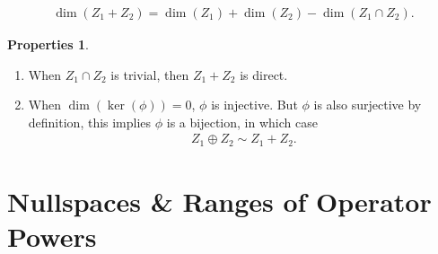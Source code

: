 \documentclass{book}
\theoremstyle{definition}
\newtheorem{prop}{Properties}[section]
\begin{document}
\begin{align*}
\dim(Z_1 + Z_2) = \dim(Z_1) + \dim(Z_2) - \dim(Z_1\cap Z_2).
\end{align*}
\begin{prop}
	$\,$
	\begin{enumerate}
		\item When $Z_1\cap Z_2$ is trivial, then $Z_1 + Z_2$ is direct. 
		\item When $\dim(\ker(\phi)) = 0$, $\phi$ is injective. But $\phi$ is also surjective by definition, this implies $\phi$ is a bijection, in which case
		\begin{align*}
		Z_1 \oplus Z_2 \sim Z_1 + Z_2.
		\end{align*} 
	\end{enumerate}
\end{prop}


\section{Nullspaces \& Ranges of Operator Powers}
\end{document}
